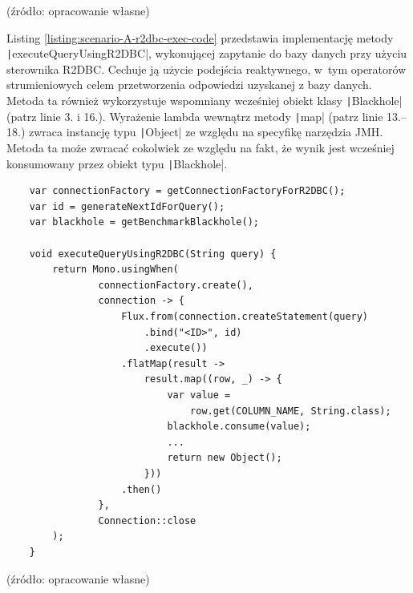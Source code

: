 \vspace{-20pt}
\begin{center}
    \small{(źródło: opracowanie własne)}
\end{center}

\newpage
Listing \ref{listing:scenario-A-r2dbc-exec-code} przedstawia implementację metody \texttt|executeQueryUsingR2DBC|, wykonującej zapytanie do bazy danych przy użyciu sterownika R2DBC. Cechuje ją użycie podejścia reaktywnego, w~tym operatorów strumieniowych celem przetworzenia odpowiedzi uzyskanej z bazy danych. Metoda ta również wykorzystuje wspomniany wcześniej obiekt klasy \texttt|Blackhole| (patrz linie 3. i 16.). Wyrażenie lambda wewnątrz metody \texttt|map| (patrz linie 13.--18.) zwraca instancję typu \texttt|Object| ze względu na specyfikę narzędzia JMH. Metoda ta może zwracać cokolwiek ze względu na fakt, że wynik jest wcześniej konsumowany przez obiekt typu \texttt|Blackhole|.

\begin{listing}[!ht]
    \begin{verbatim}
    var connectionFactory = getConnectionFactoryForR2DBC();
    var id = generateNextIdForQuery();
    var blackhole = getBenchmarkBlackhole();

    void executeQueryUsingR2DBC(String query) {
        return Mono.usingWhen(
                connectionFactory.create(),
                connection -> {
                    Flux.from(connection.createStatement(query)
                        .bind("<ID>", id)
                        .execute())
                    .flatMap(result -> 
                        result.map((row, _) -> {
                            var value =
                                row.get(COLUMN_NAME, String.class);
                            blackhole.consume(value);
                            ...
                            return new Object();
                        }))
                    .then()
                },
                Connection::close
        );
    }
    \end{verbatim}
    \vspace{-10pt}
    \caption{Uproszczona implementacja metody wykonującej zapytanie do bazy danych przy użyciu sterownika R2DBC w ramach scenariusza $\mathcal{A}$}
    \label{listing:scenario-A-r2dbc-exec-code}
\end{listing}

\vspace{-25pt}
\begin{center}
    \small{(źródło: opracowanie własne)}
\end{center}

